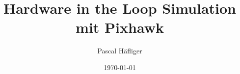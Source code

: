 \title{Hardware in the Loop Simulation mit Pixhawk}  
\author{Pascal Häfliger}
\date{\today} 

\begin{frame}
\titlepage
\end{frame} 